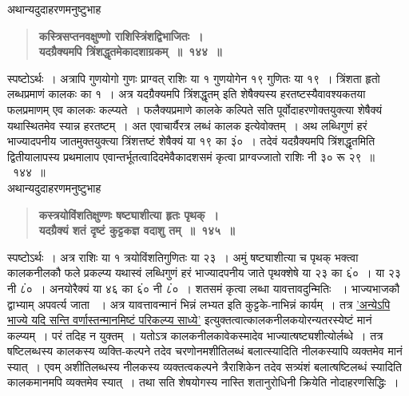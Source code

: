 \documentclass[11pt, openany]{book}
\begin{document}
\newpage

\begin{sloppypar}
{\small अथान्यदुदाहरणमनुष्टुभाह\textendash }

 \label{9.144}
\begin{quote}
{\large \textbf{{\color{purple}कस्त्रिसप्तनवक्षुण्णो राशिस्त्रिंशद्विभाजितः~।\\
यदग्रैक्यमपि त्रिंशद्धृतमेकादशाग्रकम्~॥~१४४~॥}}}
\end{quote}

स्पष्टोऽर्थः~। अत्रापि गुणयोगो गुणः प्राग्वत् राशिः या १ गुणयोगेन १९ गुणितः या १९~। त्रिंशता हृतो लब्धप्रमाणं कालकः का १~। अत्र यदग्रैक्यमपि त्रिंशद्धृतम् इति शेषैक्यस्य हरतष्टस्यैवावश्यकतया फलप्रमाणम् एव कालकः कल्प्यते~। फलैक्यप्रमाणे कालके कल्पिते सति पूर्वोदाहरणोक्तयुक्त्या शेषैक्यं यथास्थितमेव स्यान्न हरतष्टम्~। अत एवाचार्यैरत्र लब्धं कालक इत्येवोक्तम्~। अथ लब्धिगुणं हरं भाज्यादपनीय जातमुक्तयुक्त्या त्रिंशत्तष्टं शेषैक्यं या १९ का ३ं०~। तदेवं यदग्रैक्यमपि त्रिंशद्धृतमिति द्वितीयालापस्य प्रथमालाप एवान्तर्भूतत्वादिदमेवैकादशसमं कृत्वा प्राग्वज्जातो राशिः नी ३० रू २९~॥~१४४~॥\\

{\small अथान्यदुदाहरणमनुष्टुभाह\textendash }

 \label{9.145}
\begin{quote}
{\large \textbf{{\color{purple}कस्त्रयोविंशतिक्षुण्णः षष्ट्याशीत्या हृतः पृथक्~।\\
यदग्रैक्यं शतं दृष्टं कुट्टकज्ञ वदाशु तम्~॥~१४५~॥}}}
\end{quote}

स्पष्टोऽर्थः~। अत्र राशिः या १ त्रयोविंशतिगुणितः या २३~। अमुं षष्ट्याशीत्या च पृथक् भक्त्वा कालकनीलकौ फले प्रकल्प्य यथास्वं लब्धिगुणं हरं भाज्यादपनीय जाते पृथक्शेषे या २३ का ६ं०~। या २३ नी ८ं०~। अनयोरैक्यं या ४६ का ६ं० नी ८ं०~। शतसमं कृत्वा लब्धा यावत्तावदुन्मितिः ~। भाज्यभाजकौ द्वाभ्याम् अपवर्त्य जाता ~। अत्र यावत्तावन्मानं भिन्नं लभ्यत इति कुट्टके-नाभिन्नं कार्यम्~। तत्र \hyperref[9.134]{'अन्येऽपि भाज्ये यदि सन्ति वर्णास्तन्मानमिष्टं परिकल्प्य साध्ये'} इत्युक्तत्वात्कालकनीलकयोरन्यतरस्येष्टं मानं कल्प्यम्~। परं तदिह न युक्तम्~। यतोऽत्र कालकनीलकावेकस्मादेव भाज्यात्षष्ट्यशीत्योर्लब्धे~। तत्र षष्टिलब्धस्य कालकस्य व्यक्ति-कल्पने तदेव चरणोनमशीतिलब्धं बलात्स्यादिति नीलकस्यापि व्यक्तमेव मानं स्यात्~। एवम् अशीतिलब्धस्य नीलकस्य व्यक्तत्वकल्पने त्रैराशिकेन तदेव सत्र्यंशं बलात्षष्टिलब्धं स्यादिति कालकमानमपि व्यक्तमेव स्यात्~। तथा सति शेषयोगस्य नास्ति शतानुरोधिनी क्रियेति नोदाहरणसिद्धिः~।
\end{sloppypar}
\end{document}
